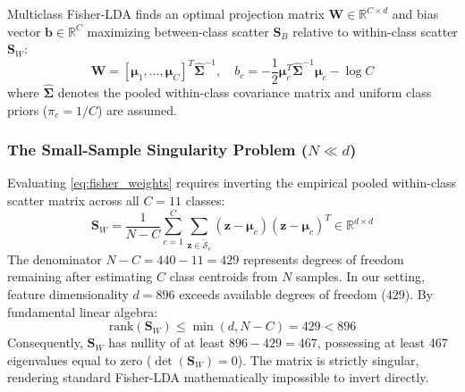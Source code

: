 \documentclass[preprint,12pt]{elsarticle}
\begin{document}
Multiclass Fisher-LDA \cite{fisher1936use, rao1948utilization} finds an optimal projection matrix $\mathbf{W} \in \mathbb{R}^{C \times d}$ and bias vector $\mathbf{b} \in \mathbb{R}^C$ maximizing between-class scatter $\mathbf{S}_B$ relative to within-class scatter $\mathbf{S}_W$:
\begin{equation}
    \label{eq:fisher_weights}
    \mathbf{W} = [\boldsymbol{\mu}_1, \dots, \boldsymbol{\mu}_C]^T \hat{\mathbf{\Sigma}}^{-1}, \quad
    b_c = -\frac{1}{2} \boldsymbol{\mu}_c^T \hat{\mathbf{\Sigma}}^{-1} \boldsymbol{\mu}_c - \log C
\end{equation}
where $\hat{\mathbf{\Sigma}}$ denotes the pooled within-class covariance matrix and uniform class priors ($\pi_c = 1/C$) are assumed.

\subsubsection{The Small-Sample Singularity Problem ($N \ll d$)}
Evaluating \eqref{eq:fisher_weights} requires inverting the empirical pooled within-class scatter matrix across all $C=11$ classes:
\begin{equation}
    \mathbf{S}_W = \frac{1}{N - C}\sum_{c=1}^C \sum_{\mathbf{z} \in \tilde{\mathcal{S}}_c} (\mathbf{z} - \boldsymbol{\mu}_c)(\mathbf{z} - \boldsymbol{\mu}_c)^T \in \mathbb{R}^{d \times d}
\end{equation}
The denominator $N - C = 440 - 11 = 429$ represents degrees of freedom remaining after estimating $C$ class centroids from $N$ samples. In our setting, feature dimensionality $d=896$ exceeds available degrees of freedom ($429$). By fundamental linear algebra:
\begin{equation}
    \text{rank}(\mathbf{S}_W) \le \min(d, N - C) = 429 < 896
\end{equation}
Consequently, $\mathbf{S}_W$ has nullity of at least $896 - 429 = 467$, possessing at least 467 eigenvalues equal to zero ($\det(\mathbf{S}_W) = 0$). The matrix is strictly singular, rendering standard Fisher-LDA mathematically impossible to invert directly.
\end{document}
